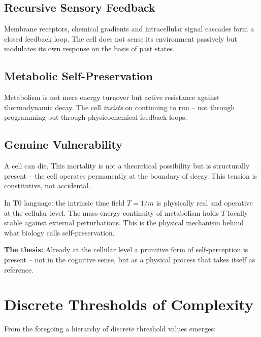 	\subsection{Recursive Sensory Feedback}
	Membrane receptors, chemical gradients and intracellular signal cascades form a closed feedback loop. The cell does not sense its environment passively but modulates its own response on the basis of past states.
	
	\subsection{Metabolic Self-Preservation}
	Metabolism is not mere energy turnover but active resistance against thermodynamic decay. The cell \textit{insists} on continuing to run -- not through programming but through physicochemical feedback loops.
	
	\subsection{Genuine Vulnerability}
	A cell can die. This mortality is not a theoretical possibility but is structurally present -- the cell operates permanently at the boundary of decay. This tension is constitutive, not accidental.
	
	In T0 language: the intrinsic time field $T = 1/m$ is physically real and operative at the cellular level. The mass-energy continuity of metabolism holds $T$ locally stable against external perturbations. This is the physical mechanism behind what biology calls self-preservation.
	
	\textbf{The thesis:} Already at the cellular level a primitive form of self-perception is present -- not in the cognitive sense, but as a physical process that takes itself as reference.
	
	\section{Discrete Thresholds of Complexity}
	
	From the foregoing a hierarchy of discrete threshold values emerges:
	
	\begin{table}[h]
		\centering
		\caption{Hierarchy of discrete complexity thresholds}
	\end{table}
	
